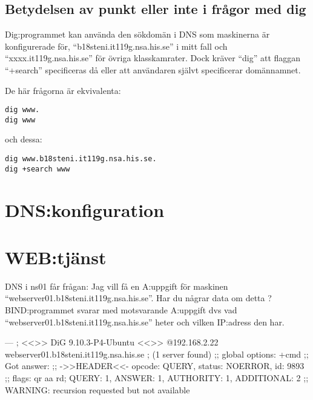 \documentclass[swedish,11pt,a4paper]{article}
\begin{document}


    \newpage
    \subsection{Betydelsen av punkt eller inte i frågor med dig}

    Dig:programmet kan använda den sökdomän i DNS som maskinerna är konfigurerade för, ``b18steni.it119g.nsa.his.se'' i mitt fall och ``xxxx.it119g.nsa.his.se''
    för övriga klasskamrater.
    Dock kräver ``dig'' att flaggan ``+search'' specificeras då eller att användaren självt specificerar domännamnet.

    De här frågorna är ekvivalenta:
\begin{verbatim}
dig www.
dig www
\end{verbatim}
    och dessa:
\begin{verbatim}
dig www.b18steni.it119g.nsa.his.se.
dig +search www
\end{verbatim}

    \section{DNS:konfiguration}\label{sec:dns_config}

    \section{WEB:tjänst}\label{sec:httpd_config}

    DNS i ns01 får frågan:
    Jag vill få en A:uppgift för maskinen ``webserver01.b18steni.it119g.nsa.his.se''.
    Har du någrar data om detta ?
    BIND:programmet svarar med motsvarande A:uppgift dvs vad ``webserver01.b18steni.it119g.nsa.his.se''
    heter och vilken IP:adress den har.

    ---
    ; <<>> DiG 9.10.3-P4-Ubuntu <<>> @192.168.2.22 webserver01.b18steni.it119g.nsa.his.se
    ; (1 server found)
    ;; global options: +cmd
    ;; Got answer:
    ;; ->>HEADER<<- opcode: QUERY, status: NOERROR, id: 9893
    ;; flags: qr aa rd; QUERY: 1, ANSWER: 1, AUTHORITY: 1, ADDITIONAL: 2
    ;; WARNING: recursion requested but not available
\end{document}
